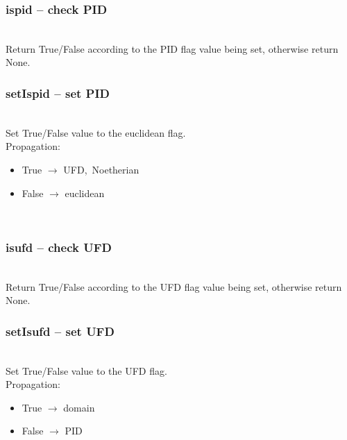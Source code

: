   \subsubsection{ispid -- check PID}
   \\
   \spacing
   \quad Return True/False according to the PID flag value being set,
        otherwise return None.\\
   \spacing
  \subsubsection{setIspid -- set PID}
   \\
   \spacing
   \quad Set True/False value to the euclidean flag.\\
   Propagation:
   \begin{itemize}
    \item True $\to$ UFD,\ Noetherian\\
    \item False $\to$ euclidean\\
   \end{itemize}
   \quad\\
   \spacing
 \subsubsection{isufd -- check UFD}
   \\
   \spacing
   \quad Return True/False according to the UFD flag value being set,
        otherwise return None.\\
   \spacing
  \subsubsection{setIsufd -- set UFD}
   \\
   \spacing
   \quad Set True/False value to the UFD flag.\\
   Propagation:
   \begin{itemize}
    \item True $\to$ domain\\
    \item False $\to$ PID\\
   \end{itemize}
   \quad\\
   \spacing
